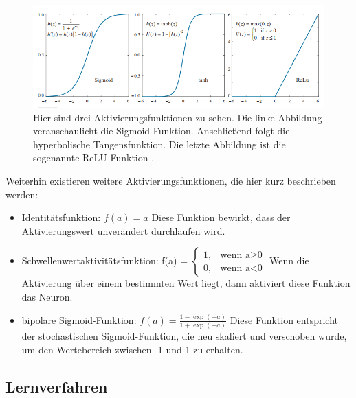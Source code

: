 \begin{figure}[h!]
	\centering
	\includegraphics[width=\textwidth]{bilder/aktivierung.PNG}
	\caption{Hier sind drei Aktivierungsfunktionen zu sehen. Die linke Abbildung veranschaulicht die Sigmoid-Funktion. Anschließend folgt die hyperbolische Tangensfunktion. Die letzte Abbildung ist die sogenannte ReLU-Funktion \cite{Gonzalez2018}.}
	\label{aktivierung}
\end{figure}

\newpage
Weiterhin existieren weitere Aktivierungsfunktionen, die hier kurz beschrieben werden\cite{Vasilev2019}:

\begin{itemize}
	\item Identitätsfunktion: $f(a) = a$ \newline Diese Funktion bewirkt, dass der Aktivierungswert unverändert durchlaufen wird. 
	
	\item Schwellenwertaktivitätsfunktion: f(a) = 
	$\begin{cases}
		1, & \text{wenn a$\geq$0}\\
		0, & \text{wenn a$<$0}
	\end{cases}$
	\newline Wenn die Aktivierung über einem bestimmten Wert liegt, dann aktiviert diese Funktion das Neuron.
	
	\item bipolare Sigmoid-Funktion: $f(a) = \frac{1-\exp(-a)}{1+\exp(-a)}$ \newline Diese Funktion entspricht der stochastischen Sigmoid-Funktion, die neu skaliert und verschoben wurde, um den Wertebereich zwischen -1 und 1 zu erhalten.
	
\end{itemize}


\subsection{Lernverfahren}

